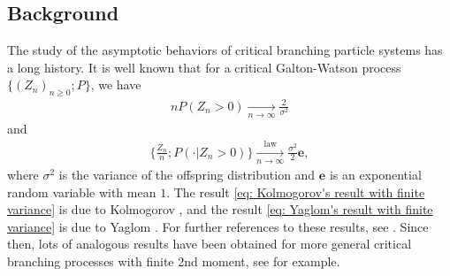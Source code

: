 \documentclass[12pt,a4paper]{amsart}
\theoremstyle{definition}
\numberwithin{equation}{section}
\begin{document}
\subsection{Background}
The study of the asymptotic behaviors of critical branching particle systems has a long history.
It is well known that for a critical Galton-Watson process $\{(Z_n)_{n\geq 0}; P\}$, we have
\begin{align}\label{eq: Kolmogorov's result with finite variance}
	n P(Z_n > 0)
	\xrightarrow[n\to \infty]{} \frac{2}{\sigma^2}
\end{align}
and
\begin{align}\label{eq: Yaglom's result with finite variance}
	\Big\{ \frac{Z_n}{n}; P(\cdot| Z_n > 0) \Big\}
	\xrightarrow[n \to \infty]{\operatorname{law}} \frac{\sigma^2}{2} \mathbf e,
\end{align}
where $\sigma^2$ is the variance of the offspring distribution and $\mathbf e$ is an exponential random variable with mean $1$.
The result \eqref{eq: Kolmogorov's result with finite variance} is due to Kolmogorov \cite{Kolmogorov1938Zur-losung}, and the result \eqref{eq: Yaglom's result with finite variance} is due to Yaglom \cite{Yaglom1947Certain}.
For further references to these results, see \cite{Harris2002The-theory, KestenNeySpitzer1966The-Galton-Watson}.
Since then, lots of analogous results have been obtained for more general critical branching processes with finite 2nd moment, see \cite{AsmussenHering1983Branching, AthreyaNey1974Functionals, AthreyaNey1972Branching, JoffeSpitzer1967On-multitype} for example.
	
\end{document}
